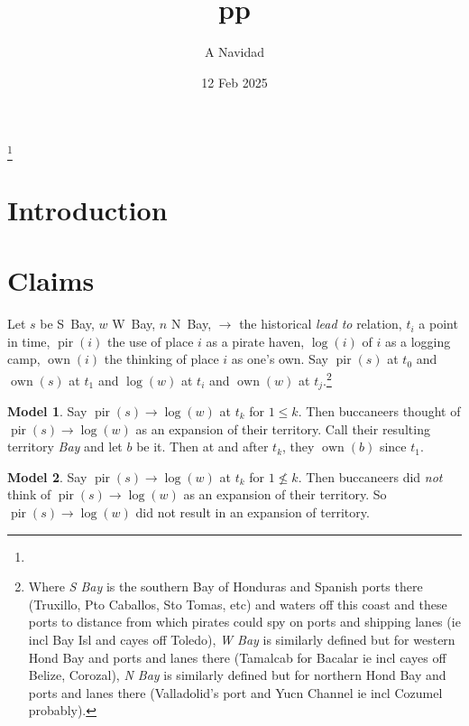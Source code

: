 \documentclass{amsart}
\newcommand{\mention}[1]{\textit{#1}}%
\DeclareMathOperator{\pir}{pir}%
\DeclareMathOperator{\own}{own}%
\theoremstyle{definition}%
\newtheorem{model}{Model}
\theoremstyle{definition}%
\begin{document}
%
%
\title{pp}
\author{A Navidad}
\address{Harvard College, Cambridge MA}
\date{12 Feb 2025}
\thanks{\lipsum[1][1-3]}%
%
%
\begin{abstract}
\lipsum[1][1-6]
\end{abstract}
\keywords{\lipsum[1][1]}
%
%
\maketitle
%
%
%
%
\section{Introduction}
\label{s:intro}
\lipsum[1-2]
%
%
%
%
\section{Claims}
\label{s:claims}
Let \(s\) be S~Bay, \(w\) W~Bay, \(n\) N~Bay, \(\to\) the historical \mention{lead to} relation, \(t_{i}\) a point in time, \(\pir(i)\) the use of place \(i\) as a pirate haven, \(\log(i)\) of \(i\) as a logging camp, \(\own(i)\) the thinking of place \(i\) as one's own. Say \(\pir(s)\) at \(t_{0}\) and \(\own(s)\) at \(t_{1}\) and \(\log(w)\) at \(t_{i}\) and \(\own(w)\) at \(t_{j}\).\footnote{Where \mention{S Bay} is the southern Bay of Honduras and Spanish ports there (Truxillo, Pto Caballos, Sto Tomas, etc) and waters off this coast and these ports to distance from which pirates could spy on ports and shipping lanes (ie incl Bay Isl and cayes off Toledo), \mention{W Bay} is similarly defined but for western Hond Bay and ports and lanes there (Tamalcab for Bacalar ie incl cayes off Belize, Corozal), \mention{N Bay} is similarly defined but for northern Hond Bay and ports and lanes there (Valladolid's port and Yucn Channel ie incl Cozumel probably).}
%
%
\begin{model}
\label{m1}
Say \(\pir(s)\to\log(w)\) at \(t_{k}\) for \(1\leq k\). %
Then buccaneers thought of \(\pir(s)\to\log(w)\) as an expansion of their territory. Call their resulting territory \mention{Bay} and let \(b\) be it. %
Then at and after \(t_{k}\), they \(\own(b)\) since \(t_{1}\).
\end{model}
%
%
\begin{model}
\label{m2}
Say \(\pir(s)\to\log(w)\) at \(t_{k}\) for \(1\not\leq k\). %
Then buccaneers did \emph{not} think of \(\pir(s)\to\log(w)\) as an expansion of their territory. So \(\pir(s)\to\log(w)\) did not result in an expansion of territory.
\end{model}
\end{document}

